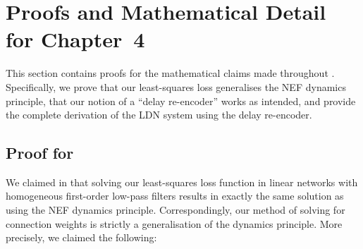 
\section{Proofs and Mathematical Detail for Chapter~4}
\label{app:temporal_tuning_proofs}

This section contains proofs for the mathematical claims made throughout .
Specifically, we prove that our least-squares loss generalises the NEF dynamics principle, that our notion of a \enquote{delay re-encoder} works as intended, and provide the complete derivation of the LDN system using the delay re-encoder.

\subsection{Proof for }
\label{app:lstsq_nef_equivalence}

We claimed in  that solving our least-squares loss function in linear networks with homogeneous first-order low-pass filters results in exactly the same solution as using the NEF dynamics principle.
Correspondingly, our method of solving for connection weights is strictly a generalisation of the dynamics principle.
More precisely, we claimed the following:

\thmTemporalLstsq*

